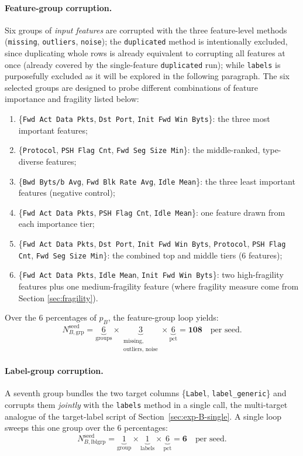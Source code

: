 \documentclass[../main.tex]{subfiles}
\begin{document}
\paragraph{Feature-group corruption.}
Six groups of \emph{input features} are corrupted with the three feature-level methods (\texttt{missing}, \texttt{outliers}, \texttt{noise}); the \texttt{duplicated} method is intentionally excluded, since duplicating whole rows is already equivalent to corrupting all features at once (already covered by the single-feature \texttt{duplicated} run); while \texttt{labels} is purposefully excluded as it will be explored in the following paragraph. The six selected groups are designed to probe different combinations of feature importance and fragility listed below:

\begin{enumerate}
    \item \{\texttt{Fwd Act Data Pkts}, \texttt{Dst Port}, \texttt{Init Fwd Win Byts}\}: the three most important features;
    \item \{\texttt{Protocol}, \texttt{PSH Flag Cnt}, \texttt{Fwd Seg Size Min}\}: the middle-ranked, type-diverse features;
    \item \{\texttt{Bwd Byts/b Avg}, \texttt{Fwd Blk Rate Avg}, \texttt{Idle Mean}\}: the three least important features (negative control);
    \item \{\texttt{Fwd Act Data Pkts}, \texttt{PSH Flag Cnt}, \texttt{Idle Mean}\}: one feature drawn from each importance tier;
    \item \{\texttt{Fwd Act Data Pkts}, \texttt{Dst Port}, \texttt{Init Fwd Win Byts}, \texttt{Protocol}, \texttt{PSH Flag Cnt}, \texttt{Fwd Seg Size Min}\}: the combined top and middle tiers (6 features);
    \item \{\texttt{Fwd Act Data Pkts}, \texttt{Idle Mean}, \texttt{Init Fwd Win Byts}\}: two high-fragility features plus one medium-fragility feature (where fragility measure come from Section \ref{sec:fragility}).
\end{enumerate}

Over the $6$ percentages of $p_{B}$, the feature-group loop yields:
\[
    N_{B,\text{grp}}^{\text{seed}}
    = \underbrace{6}_{\text{groups}} \times \underbrace{3}_{\substack{\text{missing,}\\\text{outliers, noise}}} \times \underbrace{6}_{\text{pct}}
    = \mathbf{108} \quad\text{per seed.}
\]

\paragraph{Label-group corruption.}
A seventh group bundles the two target columns \{\texttt{Label}, \texttt{label\_generic}\} and corrupts them \emph{jointly} with the \texttt{labels} method in a single call, the multi-target analogue of the target-label script of Section~\ref{sec:exp-B-single}. A single loop sweeps this one group over the $6$ percentages:
\[
    N_{B,\text{lblgrp}}^{\text{seed}}
    = \underbrace{1}_{\text{group}} \times \underbrace{1}_{\text{labels}} \times \underbrace{6}_{\text{pct}}
    = \mathbf{6} \quad\text{per seed.}
\]
\end{document}
